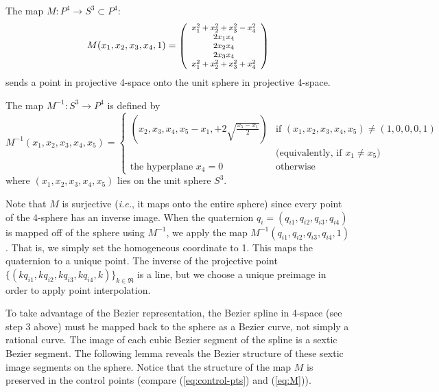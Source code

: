 \begin{corollary}
The map 
$M:P^4 \rightarrow S^3 \subset P^4$:
\begin{equation}
\label{eq:M}
	M(x_1,x_2,x_3,x_4,1) = \mbox{\footnotesize{$\left( \begin{array}{c}
		x_1^2+x_2^2+x_3^2-x_4^2 \\
		2x_1x_4 \\
		2x_2x_4 \\
		2x_3x_4 \\
		x_1^2+x_2^2+x_3^2+x_4^2
		\end{array} \right)$}}
\end{equation}
sends a point in projective 4-space onto the unit sphere in projective
4-space.
\end{corollary}

\begin{lemma}
\label{lem:invM}
The map $M^{-1}:S^3 \rightarrow P^4$ is defined by
\begin{equation}
\label{eq:invM}
M^{-1}(x_1,x_2,x_3,x_4,x_5)=
\left\{ \begin{array}{ll}
(x_2,x_3,x_4,x_5-x_1,+2\sqrt{\frac{x_5-x_1}{2}}) 
	& \mbox{if } (x_1,x_2,x_3,x_4,x_5) \neq (1,0,0,0,1) \\
	& \mbox{(equivalently, if } x_1 \neq x_5 \mbox{)} \\
\mbox{the hyperplane } x_4 = 0 
	& \mbox{otherwise}
\end{array} \right.
\end{equation}
where $(x_1,x_2,x_3,x_4,x_5)$ lies on the unit sphere $S^3$.
\end{lemma}

Note that $M$ is surjective ({\em i.e.}, it maps onto the entire sphere)
since every point of the 4-sphere has an inverse image.
When the quaternion $q_i = (q_{i1},q_{i2},q_{i3},q_{i4})$ is mapped off
of the sphere using $M^{-1}$,
we apply the map $M^{-1}(q_{i1},q_{i2},q_{i3},q_{i4},1)$.
That is, we simply set the homogeneous coordinate to 1.
This maps the quaternion to a unique point.
The inverse of the projective point 
$\{(kq_{i1},kq_{i2},kq_{i3},kq_{i4},k)\}_{k \in \Re}$
is a line,
but we choose a unique preimage in order to apply point interpolation.

To take advantage of the Bezier representation,
the Bezier spline in 4-space (see step 3 above)
must be mapped back to the sphere
as a Bezier curve, not simply a rational curve.
The image of each cubic Bezier segment of the spline is a sextic Bezier segment.
The following lemma reveals the Bezier structure of these sextic
image segments on the sphere.
Notice that the structure of the map $M$ is preserved in the control
points (compare (\ref{eq:control-pts}) and (\ref{eq:M})).

